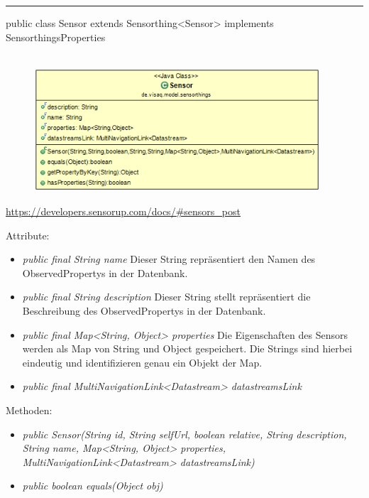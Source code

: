 \rule{\textwidth}{0.4pt}
public class Sensor extends Sensorthing<Sensor> implements SensorthingsProperties
\\\\
\begin{minipage}{0.4\textwidth}
    \begin{figure}[H]
        {\centering\includegraphics[width=0.95\textwidth]{media/backend/modell/classes/Sensor.png}}
    \end{figure}
    \end{minipage} \hfill
\begin{minipage}{0.6\textwidth}
    \url{https://developers.sensorup.com/docs/#sensors_post}
\end{minipage}

Attribute:
\begin{itemize}
    \item \emph{public final String name} Dieser String repräsentiert den Namen des ObservedPropertys in der Datenbank.
    \item \emph{public final String description} Dieser String stellt repräsentiert die Beschreibung des ObservedPropertys in der Datenbank.
    \item \emph{public final Map<String, Object> properties} Die Eigenschaften des Sensors werden als Map von String und Object gespeichert. Die Strings sind hierbei eindeutig und identifizieren genau ein Objekt der Map.
    \item \emph{public final MultiNavigationLink<Datastream> datastreamsLink} 
\end{itemize}
Methoden:
\begin{itemize}
    \item \emph{public Sensor(String id, String selfUrl, boolean relative, String description, String name, Map<String, Object> properties, MultiNavigationLink<Datastream> datastreamsLink)}
    \item \emph{public boolean equals(Object obj)} 
\end{itemize}

